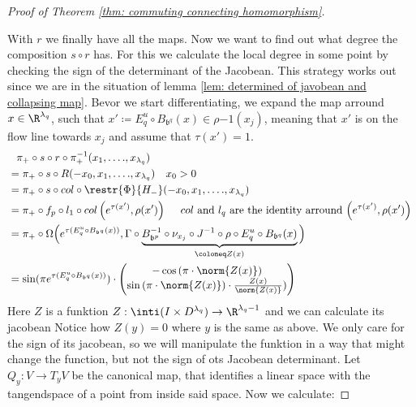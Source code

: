 \begin{proof}[Proof of Theorem \ref{thm: commuting connecting homomorphism}]
\begin{itemize}
		\end{itemize}  
		With $r$ we finally have all the maps. Now we want to find out what degree the composition
		$s\circ r$ has. For this we calculate the local degree in some point by checking the sign of the determinant of the Jacobean. This strategy works out since we are in the situation of lemma \ref{lem: determined of javobean and collapsing map}.
		Bevor we start differentiating, we expand the map arround $x\in \R^{\lambda_q}$, such that $x'\coloneq E^u_q\circ B_{\mathfrak{b}^q}(x)\in \rho{-1}(x_j)$, meaning that $x'$ is on the flow line towards $x_j$ and assume that $\tau(x')=1$.
		\begin{align*}
			&   \phantom{=}	\pi_+\circ s\circ r\circ \pi_+^{-1}(x_1,\dots .,x_{\lambda_q})\\
			&=	\pi_+\circ s\circ R (- x_0,x_1,\dots .,x_{\lambda_q}) \quad x_0>0\\
			&=	\pi_+\circ s\circ col \circ \restr{\Phi}{H_-} (-x_0,x_1,\dots .,x_{\lambda_q}) \\
			&=	\pi_+\circ f_p\circ l_1 \circ col \left(e^{\tau(x')},\rho(x')\right) \quad \text{ $col$ and $l_q$ are the identity arround $\left(e^{\tau(x')},\rho(x')\right)$ } \\
			&=\pi_+\circ \Omega  \Big(e^{\tau(E^u_q\circ B_{\mathfrak{b}^q}(x))},\Gamma \circ \underbrace{B_{\mathfrak{b}^p}^{-1} \circ \nu_{x_j}\circ J^{-1}\circ \rho \circ E^u_q\circ B_{\mathfrak{b}^q}(x)}_{\coloneq Z(x)}\Big)\\
			&=\sin(\pi e^{\tau(E^u_q\circ B_{\mathfrak{b}^q}(x))}) \cdot
			\begin{pmatrix}
				-\cos\left(\pi \cdot \norm{Z(x)}\right)\\
				\sin\left(\pi \cdot \norm{Z(x)}\right) \cdot \frac{Z(x)}{\norm{Z(x)}})
			\end{pmatrix}
		\end{align*}
		Here $Z$ is a funktion $Z: \inti(I\times D^{\lambda_q})\to \R^{\lambda_q-1}$ and we can calculate its jacobean Notice how $Z(y)=0$ where $y$ is the same as above. We only care for the sign of its jacobean, so we will manipulate the funktion in a way that might change the function, but not the sign of ots Jacobean determinant. 
		Let $Q_y: V\to T_yV$ be the canonical map, that identifies a linear space with the tangendspace of a point from inside said space. Now we calculate:
		

\end{proof}
